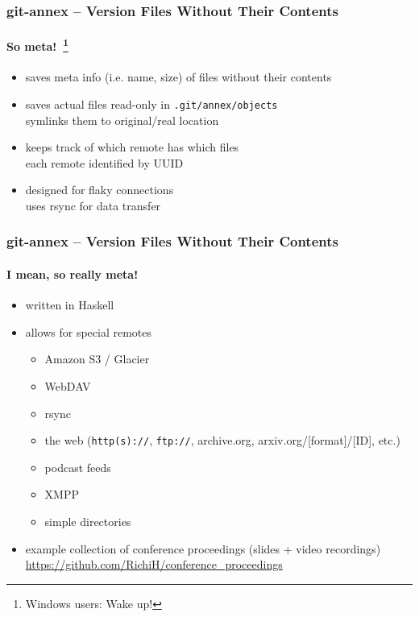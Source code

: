 \documentclass[english,hyperref={pdfpagelabels=false},aspectratio=169]{beamer}
\begin{document}
\begin{frame}[label=gitannex]
  \frametitle{git-annex -- Version Files Without Their Contents}
  \framesubtitle{So meta!~\footnote{\tiny Windows users: Wake up!}}
  \begin{itemize}
    \item saves meta info {\scriptsize\color{fzjgray50}(i.e. name, size)} of files without their contents
    \item saves actual files read-only in \texttt{.git/annex/objects}\\
      {\scriptsize symlinks them to original/real location}
    \item keeps track of which remote has which files\\
      {\scriptsize each remote identified by UUID}
    \item designed for flaky connections\\
      {\scriptsize uses rsync for data transfer}
  \end{itemize}
\end{frame}

\begin{frame}
  \frametitle{git-annex -- Version Files Without Their Contents}
  \framesubtitle{I mean, so really meta!}
  \begin{itemize}
    \item written in Haskell
    \item allows for special remotes
      \begin{itemize}
        \item Amazon S3 / Glacier
        \item WebDAV
        \item rsync
        \item the web {\scriptsize\color{fzjgray50}(\texttt{http(s)://}, \texttt{ftp://}, archive.org, arxiv.org/[format]/[ID], etc.)}
        \item podcast feeds
        \item XMPP
        \item simple directories
      \end{itemize}
    \item example collection of conference proceedings {\scriptsize\color{fzjgray50}(slides + video recordings)}\\
      {\scriptsize \url{https://github.com/RichiH/conference_proceedings}}
  \end{itemize}
\end{frame}
\end{document}
